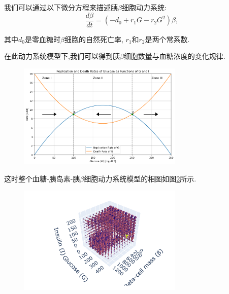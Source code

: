 我们可以通过以下微分方程来描述胰$\beta$细胞动力系统:
\begin{equation}
    \frac{d\beta}{dt} = (-d_0+r_1G-r_2G^2)\beta,
\end{equation}

其中$d_0$是零血糖时$\beta$细胞的自然死亡率, $r_1$和$r_2$是两个常系数\cite{topp2000model}. 

在此动力系统模型下,我们可以得到胰$\beta$细胞数量与血糖浓度的变化规律. 
\begin{figure}[H]
    \centering
    \includegraphics[width=0.7\textwidth]{Img/betarate.png}
    \label{fig:beta}
\end{figure}

这时整个血糖-胰岛素-胰$\beta$细胞动力系统模型的相图如图\ref{fig:3dphase}所示. 
\begin{figure}[H]
    \centering
    \includegraphics[width=0.7\textwidth]{Img/3dphase.png}
    \label{fig:3dphase}
\end{figure}

